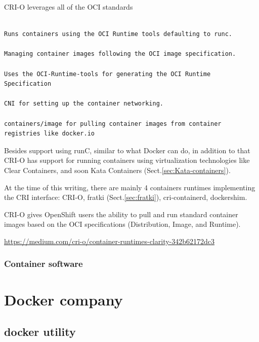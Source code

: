 CRI-O leverages all of the OCI standards
\begin{verbatim}

Runs containers using the OCI Runtime tools defaulting to runc.

Managing container images following the OCI image specification.

Uses the OCI-Runtime-tools for generating the OCI Runtime Specification

CNI for setting up the container networking.

containers/image for pulling container images from container registries like docker.io

\end{verbatim}

Besides support using runC, similar to what Docker can do, in addition to that
CRI-O has support for running containers using virtualization technologies like
Clear Containers, and soon Kata Containers (Sect.\ref{sec:Kata-containers}).

At the time of this writing, there are mainly 4 containers runtimes implementing
the CRI interface: CRI-O, fratki (Sect.\ref{sec:fratki}), cri-containerd, dockershim.


CRI-O gives OpenShift users the ability to pull and run standard container
images based on the OCI specifications (Distribution, Image, and Runtime).


\url{https://medium.com/cri-o/container-runtimes-clarity-342b62172dc3}


\subsection{Container software}

\chapter{Docker company}

\section{docker utility}


